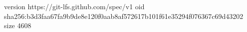 version https://git-lfs.github.com/spec/v1
oid sha256:b3d3faa67fa9b9de8e120f0aab8af572617b101f61e35294f076367c69d43202
size 4608
